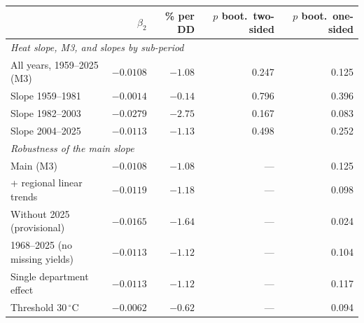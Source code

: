 \begin{tabular}{lrrrr}
\toprule
& $\hat\beta_2$ & \% per DD & $p$ boot.\ two-sided & $p$ boot.\ one-sided \\
\midrule
\multicolumn{5}{l}{\emph{Heat slope, M3, and slopes by sub-period}} \\
All years, 1959--2025 (M3) & $-0.0108$ & $-1.08$ & 0.247 & 0.125 \\
Slope 1959--1981 & $-0.0014$ & $-0.14$ & 0.796 & 0.396 \\
Slope 1982--2003 & $-0.0279$ & $-2.75$ & 0.167 & 0.083 \\
Slope 2004--2025 & $-0.0113$ & $-1.13$ & 0.498 & 0.252 \\
\midrule
\multicolumn{5}{l}{\emph{Robustness of the main slope}} \\
Main (M3) & $-0.0108$ & $-1.08$ & --- & 0.125 \\
+ regional linear trends & $-0.0119$ & $-1.18$ & --- & 0.098 \\
Without 2025 (provisional) & $-0.0165$ & $-1.64$ & --- & 0.024 \\
1968--2025 (no missing yields) & $-0.0113$ & $-1.12$ & --- & 0.104 \\
Single department effect & $-0.0113$ & $-1.12$ & --- & 0.117 \\
Threshold 30\,$^{\circ}$C & $-0.0062$ & $-0.62$ & --- & 0.094 \\
\bottomrule
\end{tabular}
